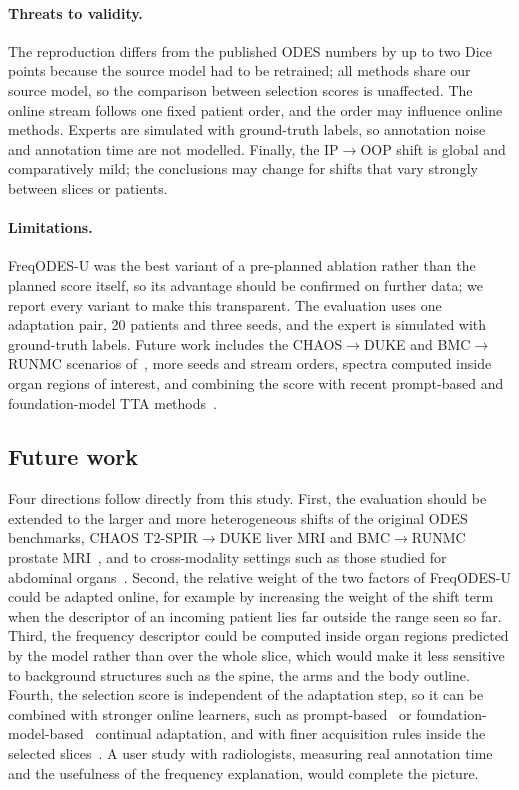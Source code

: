 \documentclass[a4paper,fleqn]{cas-dc}
\begin{document}
\paragraph{Threats to validity.} The reproduction differs from the published ODES numbers by up to two Dice points because the source model had to be retrained; all methods share our source model, so the comparison between selection scores is unaffected. The online stream follows one fixed patient order, and the order may influence online methods. Experts are simulated with ground-truth labels, so annotation noise and annotation time are not modelled. Finally, the IP$\rightarrow$OOP shift is global and comparatively mild; the conclusions may change for shifts that vary strongly between slices or patients.

\paragraph{Limitations.} FreqODES-U was the best variant of a pre-planned ablation rather than the planned score itself, so its advantage should be confirmed on further data; we report every variant to make this transparent. The evaluation uses one adaptation pair, 20 patients and three seeds, and the expert is simulated with ground-truth labels. Future work includes the CHAOS$\rightarrow$DUKE and BMC$\rightarrow$RUNMC scenarios of~\cite{islam2025odes}, more seeds and stream orders, spectra computed inside organ regions of interest, and combining the score with recent prompt-based and foundation-model TTA methods~\cite{li2025mgipt,ji2026redifm,du2026spegc}.

\subsection{Future work}
Four directions follow directly from this study. First, the evaluation should be extended to the larger and more heterogeneous shifts of the original ODES benchmarks, CHAOS T2-SPIR$\rightarrow$DUKE liver MRI and BMC$\rightarrow$RUNMC prostate MRI~\cite{islam2025odes}, and to cross-modality settings such as those studied for abdominal organs~\cite{elsayed2025abdominal,elsayed2026zerolead}. Second, the relative weight of the two factors of FreqODES-U could be adapted online, for example by increasing the weight of the shift term when the descriptor of an incoming patient lies far outside the range seen so far. Third, the frequency descriptor could be computed inside organ regions predicted by the model rather than over the whole slice, which would make it less sensitive to background structures such as the spine, the arms and the body outline. Fourth, the selection score is independent of the adaptation step, so it can be combined with stronger online learners, such as prompt-based~\cite{li2025mgipt,du2026spegc} or foundation-model-based~\cite{ji2026redifm,wu2025samtta} continual adaptation, and with finer acquisition rules inside the selected slices~\cite{gao2024superpixel,huynh2026category}. A user study with radiologists, measuring real annotation time and the usefulness of the frequency explanation, would complete the picture.
\end{document}
